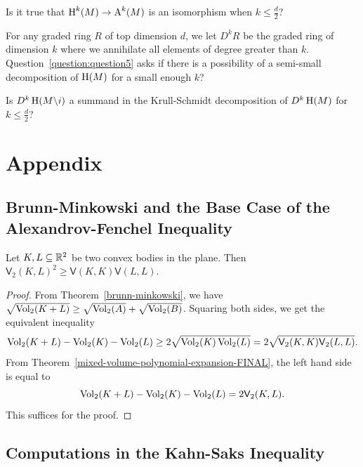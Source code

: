 \documentclass{puthesis-UG}
\begin{document}
\begin{question} \label{question:question4}
	Is it true that $\operatorname{H}^k(M) \to \operatorname{A}^k(M)$ is an isomorphism when $k \leq \frac{d}{2}$?
\end{question}

For any graded ring $R$ of top dimension $d$, we let $D^k R$ be the graded ring of dimension $k$ where we annihilate all elements of degree greater than $k$. Question~\ref{question:question5} asks if there is a possibility of a semi-small decomposition of $\operatorname{H}(M)$ for a small enough $k$? 

\begin{question} \label{question:question5}
	Is $D^k\operatorname{H}(M \backslash i)$ a summand in the Krull-Schmidt decomposition of $D^k \operatorname{H}(M)$ for $k \leq \frac{d}{2}$? 
\end{question}



\chapter{Appendix}

\section{Brunn-Minkowski and the Base Case of the Alexandrov-Fenchel Inequality}

\begin{prop} \label{base-case-for-AF-inequality}
	Let $K, L \subseteq \mathbb{R}^2$ be two convex bodies in the plane. Then $\mathsf{V}_2(K, L)^2 \geq \mathsf{V}(K, K) \mathsf{V}(L, L)$. 
\end{prop}

\begin{proof}
	From Theorem~\ref{brunn-minkowski}, we have $\sqrt{\operatorname{Vol}_2(K + L)} \geq \sqrt{\operatorname{Vol}_2(A)} + \sqrt{\operatorname{Vol}_2(B)}$. Squaring both sides, we get the equivalent inequality
	\[	
		\operatorname{Vol}_2(K+L) - \operatorname{Vol}_2(K) - \operatorname{Vol}_2(L) \geq 2 \sqrt{\operatorname{Vol}_2(K) \operatorname{Vol}_2(L)} = 2 \sqrt{\mathsf{V}_2(K, K) \mathsf{V}_2(L, L)}.
	\]
	From Theorem~\ref{mixed-volume-polynomial-expansion-FINAL}, the left hand side is equal to 
	\[		
		\operatorname{Vol}_2(K+L) - \operatorname{Vol}_2(K) - \operatorname{Vol}_2(L) = 2 \mathsf{V}_2(K, L).
	\]
	This suffices for the proof. 
\end{proof}

\section{Computations in the Kahn-Saks Inequality}
\end{document}

